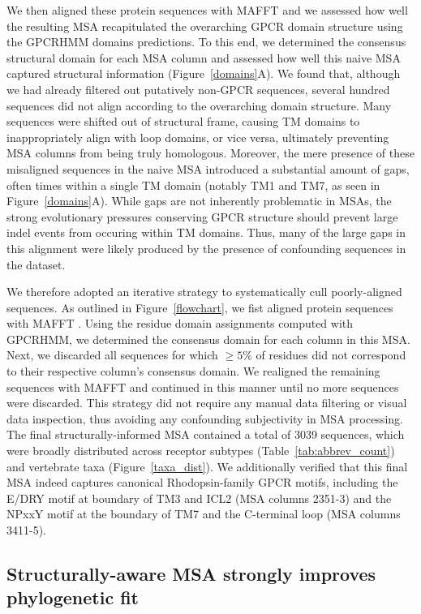 \documentclass[fleqn,10pt]{wlpeerj}
\begin{document}
We then aligned these protein sequences with MAFFT \citep{mafftv7} and we assessed how well the resulting MSA recapitulated the overarching GPCR domain structure using the GPCRHMM domains predictions. To this end, we determined the consensus structural domain for each MSA column and assessed how well this naive MSA captured structural information (Figure~\ref{domains}A). We found that, although we had already filtered out putatively non-GPCR sequences, several hundred sequences did not align according to the overarching domain structure. Many sequences were shifted out of structural frame, causing TM domains to inappropriately align with loop domains, or vice versa, ultimately preventing MSA columns from being truly homologous. Moreover, the mere presence of these misaligned sequences in the naive MSA introduced a substantial amount of gaps, often times within a single TM domain (notably TM1 and TM7, as seen in Figure~\ref{domains}A). While gaps are not inherently problematic in MSAs, the strong evolutionary pressures conserving GPCR structure should prevent large indel events from occuring within TM domains. Thus, many of the large gaps in this alignment were likely produced by the presence of confounding sequences in the dataset.

We therefore adopted an iterative strategy to systematically cull poorly-aligned sequences. As outlined in Figure~\ref{flowchart}, we fist aligned protein sequences with MAFFT \citep{mafftv7}. Using the residue domain assignments computed with GPCRHMM, we determined the consensus domain for each column in this MSA. Next, we discarded all sequences for which $\geq 5\%$ of residues did not correspond to their respective column's consensus domain. We realigned the remaining sequences with MAFFT and continued in this manner until no more sequences were discarded. This strategy did not require any manual data filtering or visual data inspection, thus avoiding any confounding subjectivity in MSA processing. The final structurally-informed MSA contained a total of 3039 sequences, which were broadly distributed across receptor subtypes (Table~\ref{tab:abbrev_count}) and vertebrate taxa (Figure~\ref{taxa_dist}). We additionally verified that this final MSA indeed captures canonical Rhodopsin-family GPCR motifs, including the E/DRY motif at boundary of TM3 and ICL2 (MSA columns 2351-3) and the NPxxY motif at the boundary of TM7 and the C-terminal loop (MSA columns 3411-5).



\subsection*{Structurally-aware MSA strongly improves phylogenetic fit}
\end{document}
